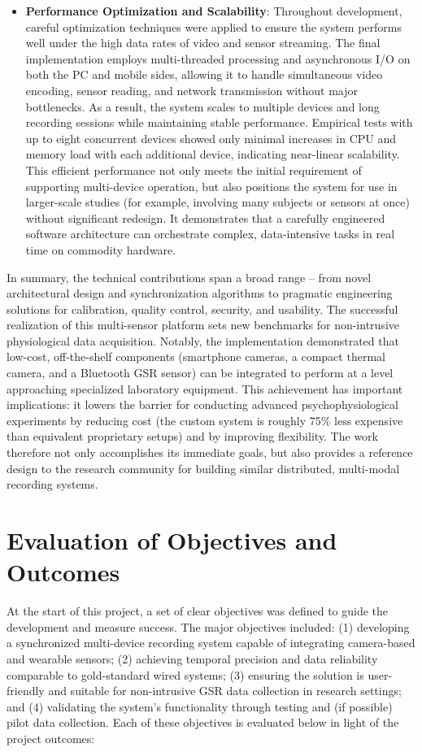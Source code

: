 \begin{itemize}
\item \textbf{Performance Optimization and Scalability}: Throughout development, careful optimization techniques were applied to ensure the system performs well under the high data rates of video and sensor streaming. The final implementation employs multi-threaded processing and asynchronous I/O on both the PC and mobile sides, allowing it to handle simultaneous video encoding, sensor reading, and network transmission without major bottlenecks. As a result, the system scales to multiple devices and long recording sessions while maintaining stable performance. Empirical tests with up to eight concurrent devices showed only minimal increases in CPU and memory load with each additional device, indicating near-linear scalability. This efficient performance not only meets the initial requirement of supporting multi-device operation, but also positions the system for use in larger-scale studies (for example, involving many subjects or sensors at once) without significant redesign. It demonstrates that a carefully engineered software architecture can orchestrate complex, data-intensive tasks in real time on commodity hardware.
\end{itemize}

In summary, the technical contributions span a broad range -- from novel architectural design and synchronization algorithms to pragmatic engineering solutions for calibration, quality control, security, and usability. The successful realization of this multi-sensor platform sets new benchmarks for non-intrusive physiological data acquisition. Notably, the implementation demonstrated that low-cost, off-the-shelf components (smartphone cameras, a compact thermal camera, and a Bluetooth GSR sensor) can be integrated to perform at a level approaching specialized laboratory equipment. This achievement has important implications: it lowers the barrier for conducting advanced psychophysiological experiments by reducing cost (the custom system is roughly 75\% less expensive than equivalent proprietary setups) and by improving flexibility. The work therefore not only accomplishes its immediate goals, but also provides a reference design to the research community for building similar distributed, multi-modal recording systems.

\section{Evaluation of Objectives and Outcomes}

At the start of this project, a set of clear objectives was defined to guide the development and measure success. The major objectives included: (1) developing a synchronized multi-device recording system capable of integrating camera-based and wearable sensors; (2) achieving temporal precision and data reliability comparable to gold-standard wired systems; (3) ensuring the solution is user-friendly and suitable for non-intrusive GSR data collection in research settings; and (4) validating the system's functionality through testing and (if possible) pilot data collection. Each of these objectives is evaluated below in light of the project outcomes:


